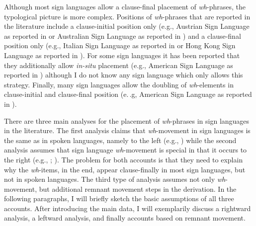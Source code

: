 Although most sign languages allow a clause-final placement of \textit{wh}-phrases, the typological picture is more complex. Positions of \textit{wh}-phrases that are reported in the literature include a clause-initial position only (e.g., Austrian Sign Language as reported in \citealt{schalber2006chin} or Australian Sign Language as reported in \citealt{johnston2007australian}) and a clause-final position only (e.g., Italian Sign Language as reported in \citealt{cecchetto2009another} or Hong Kong Sign Language as reported in \citealt{tang2006questions}). For some sign languages it has been reported that they additionally allow \textit{in-situ} placement (e.g., American Sign Language as reported in \citealt{neidle2000syntax}) although I do not know any sign language which only allows this strategy. Finally, many sign languages allow the doubling of \textit{wh}-elements in clause-initial and clause-final position (e.\,.g, American Sign Language as reported in \citealt{neidle2000syntax}).


\largerpage[-1]
There are three main analyses for the placement of \textit{wh}-phrases in sign languages in the literature. The first analysis claims that \textit{wh}-movement in sign languages is the same as in spoken languages, namely to the left (e.g., \citealt{petronio1997}) while the second analysis assumes that sign language \textit{wh}-movement is special in that it occurs to the right (e.g., \citealt{aarons1992clausal}; \citealt{cecchetto2009another}). The problem for both accounts is that they need to explain why the \textit{wh}-items, in the end, appear clause-finally in most sign languages, but not in spoken languages. The third type of analysis assumes not only \textit{wh}-movement, but additional remnant movement steps in the derivation. In the following paragraphs, I will briefly sketch the basic assumptions of all three accounts. After introducing the main data, I will exemplarily discuss a rightward analysis, a leftward analysis, and finally  accounts based on remnant movement.


